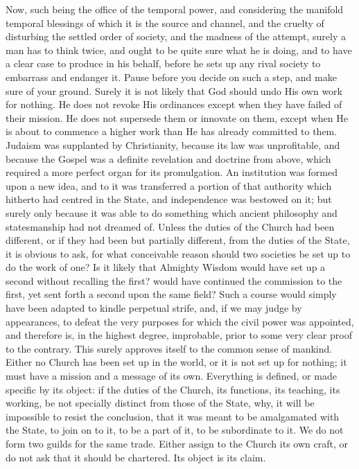 Now, such being the office of the temporal power, and considering
the manifold temporal blessings of which it is the source and channel,
and the cruelty of disturbing the settled order of society, and the
madness of the attempt, surely a man has to think twice, and ought to
be quite sure what he is doing, and to have a clear case to produce in
his behalf, before he sets up any rival society to embarrass and
endanger it. Pause before you decide on such a step, and make sure of
your ground. Surely it is not likely that God should undo His own work
for nothing. He does not revoke His ordinances except when they have
failed of their mission. He does not supersede them or innovate on
them, except when He is about to commence a higher work than He has
already committed to them. Judaism was supplanted by Christianity,
because its law was unprofitable, and because the Gospel was a
definite revelation and doctrine from above, which required a more
perfect organ for its promulgation. An institution was formed upon a
new idea, and to it was transferred a portion of that authority which
hitherto had centred in the State, and independence was bestowed on
it; but surely only because it was able to do something which ancient
philosophy and statesmanship had not dreamed of. Unless the duties of
the Church had been different, or if they had been but partially
different, from the duties of the State, it is obvious to ask, for
what conceivable reason should two societies be set up to do the work
of one? Is it likely that Almighty Wisdom would have set up a second
without recalling the first? would have continued the commission to
the first, yet sent forth a second upon the same field? Such a course
would simply have been adapted to kindle perpetual strife, and, if we
may judge by appearances, to defeat the very purposes for which the
civil power was appointed, and therefore is, in the highest degree,
improbable, prior to some very clear proof to the contrary. This
surely approves itself to the common sense of mankind. Either no
Church has been set up in the world, or it is not set up for nothing;
it must have a mission and a message of its own. Everything is
defined, or made specific by its object: if the duties of the Church,
its functions, its teaching, its working, be not specially distinct
from those of the State, why, it will be impossible to resist the
conclusion, that it was meant to be amalgamated with the State, to
join on to it, to be a part of it, to be subordinate to it. We do not
form two guilds for the same trade. Either assign to the Church its
own craft, or do not ask that it should be chartered. Its object is
its claim.

